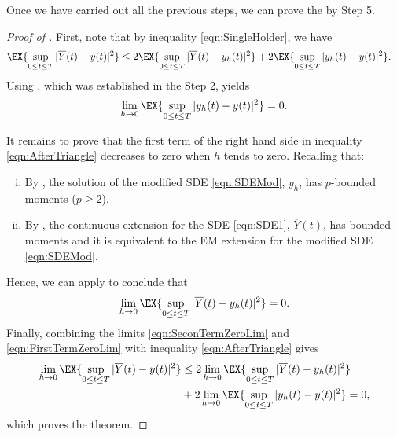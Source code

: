 	Once we have carried out all the previous steps, we can prove the  by Step 5.%
\begin{proof}[Proof of ]
	First,  note that by inequality \eqref{eqn:SingleHolder}, we have
	\begin{align}\label{eqn:AfterTriangle}
		\EX{\sup_{0\leq t \leq T}|\overline{Y}(t) - y(t)|^2}
		&\leq
		2\EX{
			\sup_{0\leq t \leq T}
			|\overline{Y}(t) - y_h(t)|^2
		}
		+
		2\EX{
			\sup_{0\leq t \leq T}
			|y_h(t) - y(t)|^2
		}.
	\end{align}
	Using , which was established in the Step 2, yields
	\begin{equation}\label{eqn:SeconTermZeroLim}
		\lim_{h\to 0}
		\EX{
			\sup_{0\leq t \leq T}
			|y_h(t) - y(t)|^2
		} = 0.
	\end{equation}
	
		It remains to prove that the first term of the right hand side in inequality \eqref{eqn:AfterTriangle} 
		decreases to zero
	when $h$ tends to zero. Recalling that:
	\begin{enumerate}[i)]
		\item 
			By , the solution of the modified SDE \eqref{eqn:SDEMod}, $y_h$, has
			$p$-bounded moments ($p\geq 2$).
		\item
			By , the \SM continuous extension for the SDE \eqref{eqn:SDE1},
			$\overline{Y}(t)$, has bounded moments and it is equivalent to the EM extension for the modified SDE 
			\eqref{eqn:SDEMod}.
	\end{enumerate}
	Hence, we can apply 
	 to conclude that
	\begin{equation}\label{eqn:FirstTermZeroLim}
		\lim_{h\to 0}
		\EX{
			\sup_{0\leq t \leq T}
			|\overline{Y}(t) - y_h(t)|^2
		} = 0.
	\end{equation}
	Finally, combining the limits \eqref{eqn:SeconTermZeroLim} and \eqref{eqn:FirstTermZeroLim} with 
	inequality \eqref{eqn:AfterTriangle} gives
	\begin{align*}
		\lim_{h \to 0}
		\EX{
			\sup_{0\leq t \leq T}
			|\overline{Y}(t) - y(t)|^2
		}
		&\leq	
		2\lim_{h\to 0}
		\EX{
			\sup_{0\leq t \leq T}
			|\overline{Y}(t) - y_h(t)|^2
		}
		\\
		&
		+
		2\lim_{h\to 0}
		\EX{
			\sup_{0\leq t \leq T}
			|y_h(t) - y(t)|^2
		} = 0,
	\end{align*}
	which proves the theorem. 
\end{proof}
%